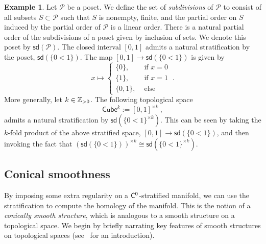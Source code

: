 \documentclass{article}
\newcommand{\mc}[1]{\mathcal{#1}}
\newcommand{\msf}[1]{\mathsf{#1}}
\theoremstyle{definition}
\newtheorem{example}[theorem]{Example}
\begin{document}
\begin{example}\label{cubeStrat}
    Let $\mc{P}$ be a poset. We define the set of \emph{subdivisions} of $\mc{P}$ to consist of all 
    subsets $S \subset \mc{P}$ such that $S$ is nonempty, finite, and the partial order on $S$ induced by 
    the partial order of $\mc{P}$ is a linear order. There is a natural partial order of the subdivisions of a poset
    given by inclusion of sets. We denote this poset by $\msf{sd}(\mc{P})$.
    The closed interval $[0,1]$ admits a natural stratification by the poset, $\msf{sd}(\{0<1\})$.
    The map $[0,1] \to \msf{sd}(\{0<1\})$ is given by
    $$x \mapsto \begin{cases} \{0\}, &\text{ if } x=0 \\ \{1\}, &\text{ if } x=1 \\ \{0,1\}, &\text{ else}
        \end{cases}~.$$
    More generally, let $k \in \mathbb Z_{>0}$. The following topological space
    $$\msf{Cube}^k := [0,1]^{\times k}~,$$
    admits a natural stratification by $\msf{sd}\left(\{0<1\}^{\times k}\right)$. This can be seen by taking the
    $k$-fold product of the above stratified space, $[0,1] \to \msf{sd}(\{0<1\})$, and then invoking the fact
    that $\left(\msf{sd}(\{0<1\})\right)^{\times k} \cong 
    \msf{sd}\left(\{0<1\}^{\times k}\right)$.
\end{example}

\subsection{Conical smoothness}
By imposing some extra regularity on a $\mathsf C^0$-stratified manifold, we can use the stratification to compute the
homology of the manifold. This is the notion of a \emph{conically smooth structure}, which is analogous to a 
smooth structure on a topological space. 
We begin by briefly narrating key features of smooth structures on topological spaces (see~\cite{manifolds} for an introduction). \\
\end{document}
